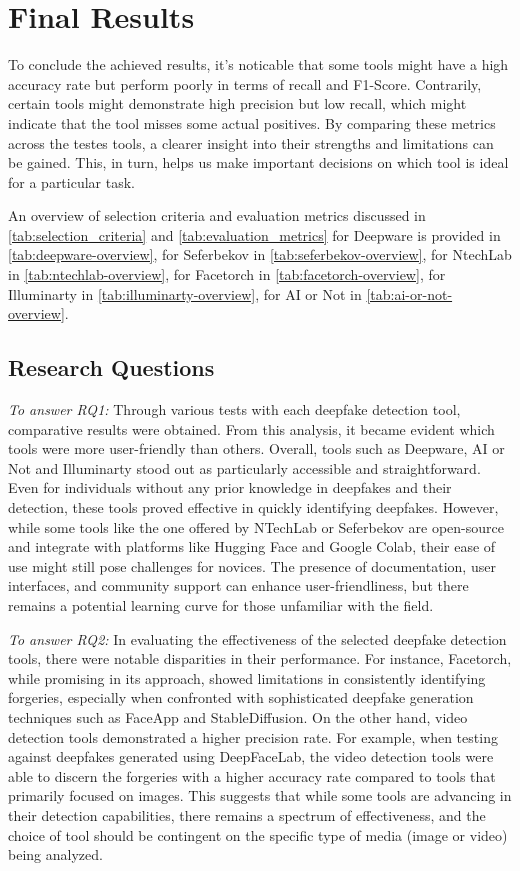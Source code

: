 \section{Final Results}\label{sec:final_results}
To conclude the achieved results, it's noticable that some tools might have a high accuracy rate
but perform poorly in terms of recall and F1-Score. Contrarily, certain tools might demonstrate
high precision but low recall, which might indicate that the tool misses some actual
positives. By comparing these metrics across the testes tools, a clearer insight into their
strengths and limitations can be gained. This, in turn, helps us make important decisions on
which tool is ideal for a particular task.

An overview of selection criteria and evaluation metrics discussed in \autoref{tab:selection_criteria}
and \autoref{tab:evaluation_metrics} for Deepware is provided in \autoref{tab:deepware-overview}, for Seferbekov in \autoref{tab:seferbekov-overview},
for NtechLab in \autoref{tab:ntechlab-overview}, for Facetorch in \autoref{tab:facetorch-overview},
for Illuminarty in \autoref{tab:illuminarty-overview}, for AI or Not in \autoref{tab:ai-or-not-overview}.

\subsection{Research Questions}
\textit{To answer \ac{RQ}1:} Through various tests with each deepfake detection tool,
comparative results were obtained. From this analysis, it became evident which tools were more
user-friendly than others. Overall, tools such as Deepware, AI or Not and Illuminarty stood out
as particularly accessible and straightforward. Even for individuals without any prior knowledge
in deepfakes and their detection, these tools proved effective in quickly identifying deepfakes.
However, while some tools like the one offered by NTechLab or Seferbekov are open-source and
integrate with platforms like Hugging Face and Google Colab, their ease of use might still pose
challenges for novices. The presence of documentation, user interfaces, and community support
can enhance user-friendliness, but there remains a potential learning curve for those unfamiliar
with the field.

\textit{To answer \ac{RQ}2:} In evaluating the effectiveness of the selected deepfake detection
tools, there were notable disparities in their performance. For instance, Facetorch, while
promising in its approach, showed limitations in consistently identifying forgeries,
especially when confronted with sophisticated deepfake generation techniques such as FaceApp
and StableDiffusion. On the other hand, video detection tools demonstrated a higher precision
rate. For example, when testing against deepfakes generated using DeepFaceLab, the video
detection tools were able to discern the forgeries with a higher accuracy rate compared to
tools that primarily focused on images. This suggests that while some tools are advancing
in their detection capabilities, there remains a spectrum of effectiveness, and the choice
of tool should be contingent on the specific type of media (image or video) being analyzed.


